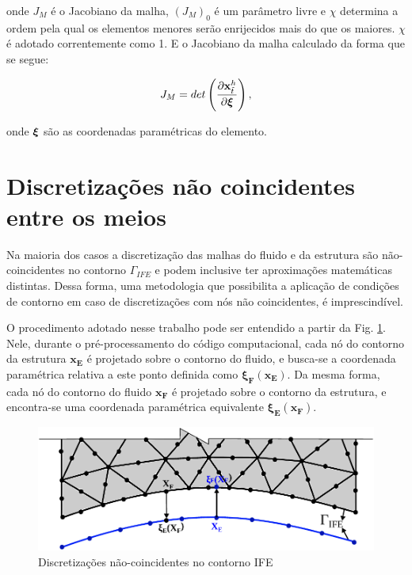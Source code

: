 \documentclass[tese_patricia]{subfiles}
\begin{document}
\noindent onde $J_M$ é o Jacobiano da malha, $(J_M)_0$ é um parâmetro livre e $\chi$ determina a ordem pela qual os elementos menores serão enrijecidos mais do que os maiores.  $\chi$ é adotado correntemente como 1. E o Jacobiano da malha calculado da forma que se segue:

\begin{align}
	J_M = det\left(\frac{\partial\mathbf{x}^h_{\tilde{t}}}{\partial\boldsymbol{\xi}}\right), 
	\label{eq:3}
\end{align}

\noindent onde $\boldsymbol{\xi}$ são as coordenadas paramétricas do elemento.

\section{Discretizações não coincidentes entre os meios}

Na maioria dos casos a discretização das malhas do fluido e da estrutura são não-coincidentes no contorno $\Gamma_{IFE}$ e podem inclusive ter aproximações matemáticas distintas. Dessa forma, uma metodologia que possibilita a aplicação de condições de contorno em caso de discretizações com nós não coincidentes, é imprescindível. 

O procedimento adotado nesse trabalho pode ser entendido a partir da Fig. \ref{fig:contornoIFE}. Nele, durante o pré-processamento do código computacional, cada nó do contorno da estrutura $\mathbf{x_E}$ é projetado sobre o contorno do fluido, e busca-se a coordenada paramétrica relativa a este ponto definida como $\boldsymbol{\xi_{F}}(\mathbf{x_E})$. Da mesma forma, cada nó do contorno do fluido $\mathbf{x_F}$ é projetado sobre o contorno da estrutura, e encontra-se uma coordenada paramétrica equivalente $\boldsymbol{\xi_{E}}(\mathbf{x_F})$. 


\begin{figure}[htb!]
	\centering 
	\includegraphics[scale=0.9,trim=0cm 0cm 0cm 0cm, clip=true]{Imagens/Cap7/contornoIFE.pdf}	
	\caption{Discretizações não-coincidentes no contorno IFE}
	\label{fig:contornoIFE}
\end{figure}
\end{document}
